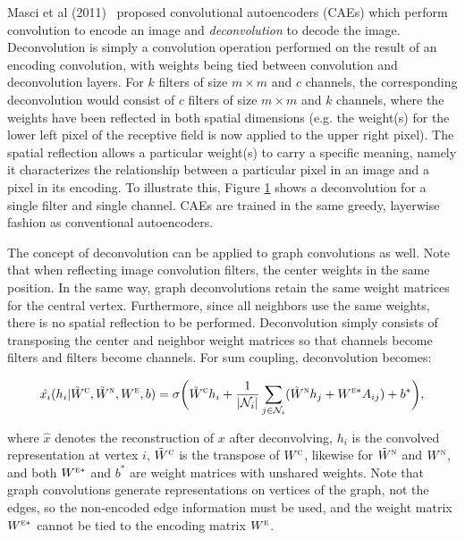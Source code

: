 Masci et al (2011)~\cite{masci2011} proposed convolutional autoencoders (CAEs) which perform convolution to encode an image and \emph{deconvolution} to decode the image.
Deconvolution is simply a convolution operation performed on the result of an encoding convolution, with weights being tied between convolution and deconvolution layers.
For $k$ filters of size $m \times m$ and $c$ channels, the corresponding deconvolution would consist of $c$ filters of size $m \times m$ and $k$ channels, where the weights have been reflected in both spatial dimensions (e.g. the weight(s) for the lower left pixel of the receptive field is now applied to the upper right pixel).
The spatial reflection allows a particular weight(s) to carry a specific meaning, namely it characterizes the relationship between a particular pixel in an image and a pixel in its encoding.
To illustrate this, Figure \ref{fig:deconv} shows a deconvolution for a single filter and single channel.
CAEs are trained in the same greedy, layerwise fashion as conventional autoencoders.

\begin{figure}
	\caption{
		\label{fig:deconv}}
\end{figure}


The concept of deconvolution can be applied to graph convolutions as well.
Note that when reflecting image convolution filters, the center weights in the same position.
In the same way, graph deconvolutions retain the same weight matrices for the central vertex. 
Furthermore, since all neighbors use the same weights, there is no spatial reflection to be performed.
Deconvolution simply consists of transposing the center and neighbor weight matrices so that channels become filters and filters become channels.
For sum coupling, deconvolution becomes:

\begin{equation}
\hat{x_i}(h_i | \tilde{W}^\textsc{c}, \tilde{W}^\textsc{n}, W^\textsc{e}, b) = \sigma \bigg( \tilde{W}^{\textsc{c}} h_i + \frac{1}{|\mathcal{N}_i|}\sum_{j \in \mathcal{N}_i} (\tilde{W}^{\textsc{n}} h_j + W^{\textsc{e}*} A_{ij}) + b^* \bigg),
\label{eq:sum_deconv}
\end{equation}

\noindent
where $\hat{x}$ denotes the reconstruction of $x$ after deconvolving, $h_i$ is the convolved representation at vertex $i$, $\tilde{W}^\textsc{c}$ is the transpose of $W^\textsc{c}$, likewise for $\tilde{W}^\textsc{n}$ and $W^\textsc{n}$, and both $W^{\textsc{e}*}$ and $b^*$ are weight matrices with unshared weights. 
Note that graph convolutions generate representations on vertices of the graph, not the edges, so the non-encoded edge information must be used, and the weight matrix $W^{\textsc{e}*}$ cannot be tied to the encoding matrix $W^{\textsc{e}}$.


